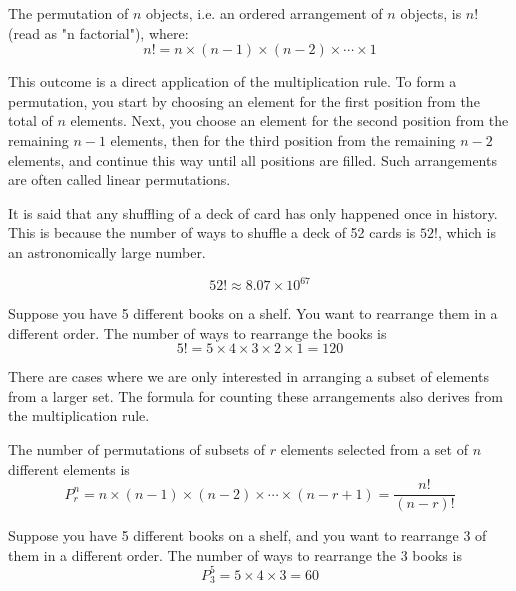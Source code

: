 \begin{definition}
    The permutation of \(n\) objects, i.e. an ordered arrangement of \(n\) objects, is \(n!\) (read as "n factorial"), where:
    \[
    n! = n \times (n-1) \times (n-2) \times \cdots \times 1
    \]
\end{definition}

This outcome is a direct application of the multiplication rule. To form a permutation, you start by choosing an element for the first position from the total of $n$ elements. Next, you choose an element for the second position from the remaining $n-1$ elements, then for the third position from the remaining $n-2$ elements, and continue this way until all positions are filled. Such arrangements are often called linear permutations.

\begin{example}
    It is said that any shuffling of a deck of card has only happened once in history. This is because the number of ways to shuffle a deck of 52 cards is \(52!\), which is an astronomically large number.

    \[52! \approx 8.07 \times 10^{67}\]
\end{example}

\begin{example}
    Suppose you have 5 different books on a shelf. You want to rearrange them in a different order. The number of ways to rearrange the books is
    \[5! = 5 \times 4 \times 3 \times 2 \times 1 = 120\]
\end{example}

There are cases where we are only interested in arranging a subset of elements from a larger set. The formula for counting these arrangements also derives from the multiplication rule.

\begin{definition}
    The number of permutations of subsets of $r$ elements selected from a set of $n$ different elements is
    \[
    P_r^n=n \times(n-1) \times(n-2) \times \cdots \times(n-r+1)=\frac{n!}{(n-r)!}
    \]
\end{definition}

\begin{example}
    Suppose you have 5 different books on a shelf, and you want to rearrange 3 of them in a different order. The number of ways to rearrange the 3 books is
    \[
    P_3^5=5 \times 4 \times 3 = 60
    \]
\end{example}

